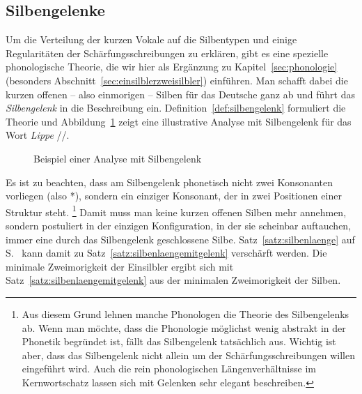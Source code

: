 \subsection{Silbengelenke}

\label{sec:silbengelenk}

Um die Verteilung der kurzen Vokale auf die Silbentypen und einige Regularitäten der Schärfungsschreibungen zu erklären, gibt es eine spezielle phonologische Theorie, die wir hier als Ergänzung zu Kapitel~\ref{sec:phonologie} (besonders Abschnitt~\ref{sec:einsilblerzweisilbler}) einführen.
Man schafft dabei die kurzen offenen -- also einmorigen -- Silben für das Deutsche ganz ab und führt das \textit{Silbengelenk} in die Beschreibung ein.
Definition~\ref{def:silbengelenk} formuliert die Theorie und Abbildung~\ref{fig:silbgel001} zeigt eine illustrative Analyse mit Silbengelenk für das Wort \textit{Lippe} //.


\begin{figure}
  \centering
  \caption{Beispiel einer Analyse mit Silbengelenk}
  \label{fig:silbgel001}
\end{figure}

Es ist zu beachten, dass am Silbengelenk phonetisch nicht zwei Konsonanten vorliegen (also *\textipa{[lIp.p@]}), sondern ein einziger Konsonant, der in zwei Positionen einer Struktur steht.%
\footnote{Aus diesem Grund lehnen manche Phonologen die Theorie des Silbengelenks ab.
Wenn man möchte, dass die Phonologie möglichst wenig abstrakt in der Phonetik begründet ist, fällt das Silbengelenk tatsächlich aus.
Wichtig ist aber, dass das Silbengelenk nicht allein um der Schärfungsschreibungen willen eingeführt wird.
Auch die rein phonologischen Längenverhältnisse im Kernwortschatz lassen sich mit Gelenken sehr elegant beschreiben.}
Damit muss man keine kurzen offenen Silben mehr annehmen, sondern postuliert in der einzigen Konfiguration, in der sie scheinbar auftauchen, immer eine durch das Silbengelenk geschlossene Silbe.
Satz~\ref{satz:silbenlaenge} auf S.~\pageref{satz:silbenlaenge} kann damit zu Satz~\ref{satz:silbenlaengemitgelenk} verschärft werden.
Die minimale Zweimorigkeit der Einsilbler ergibt sich mit Satz~\ref{satz:silbenlaengemitgelenk} aus der minimalen Zweimorigkeit der Silben.

